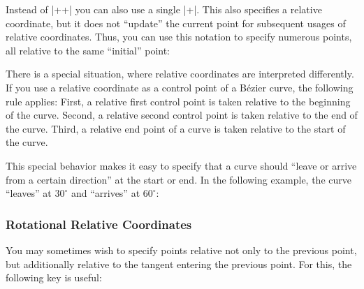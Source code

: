 Instead of |++| you can also use a single |+|. This also specifies a relative
coordinate, but it does not ``update'' the current point for subsequent usages
of relative coordinates. Thus, you can use this notation to specify numerous
points, all relative to the same ``initial'' point:

\begin{codeexample}[]
\end{codeexample}

There is a special situation, where relative coordinates are interpreted
differently. If you use a relative coordinate as a control point of a Bézier
curve, the following rule applies: First, a relative first control point is
taken relative to the beginning of the curve. Second, a relative second control
point is taken relative to the end of the curve. Third, a relative end point of
a curve is taken relative to the start of the curve.

This special behavior makes it easy to specify that a curve should ``leave or
arrive from a certain direction'' at the start or end. In the following
example, the curve ``leaves'' at $30^\circ$ and ``arrives'' at $60^\circ$:
%
\begin{codeexample}[]
\end{codeexample}


\subsubsection{Rotational Relative Coordinates}

You may sometimes wish to specify points relative not only to the previous
point, but additionally relative to the tangent entering the previous point.
For this, the following key is useful:


